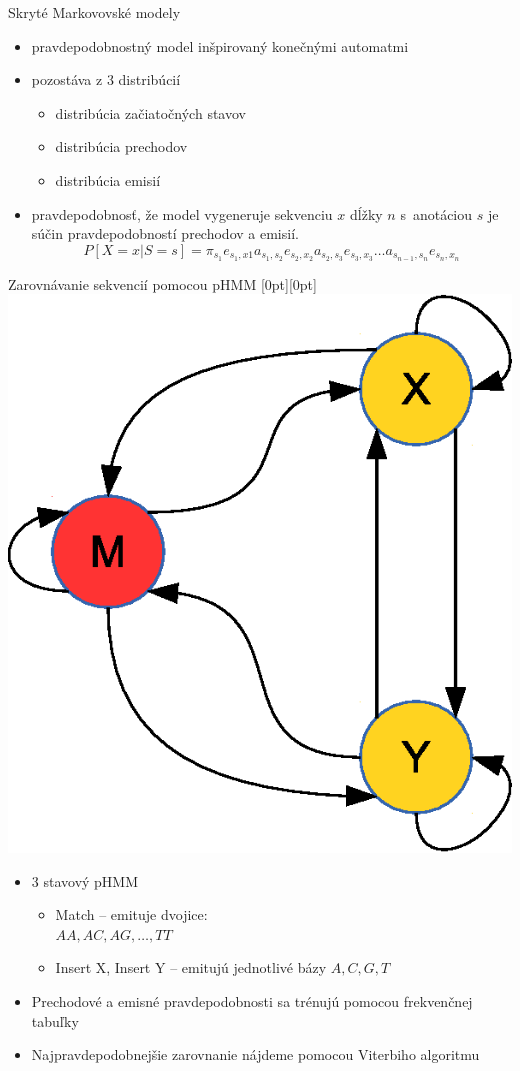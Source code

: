 \documentclass[xcolor=dvipsnames, compress, 12pt]{beamer}
\newcommand{\lenitem}[2][.6\linewidth]{\parbox[t]{#1}{\strut #2\strut}}
\theoremstyle{definition}
\begin{document}
\begin{frame}{Skryté Markovovské modely}
  \begin{itemize}
    \item pravdepodobnostný model inšpirovaný konečnými automatmi
    \item pozostáva z 3 distribúcií
    \begin{itemize}
      \item distribúcia začiatočných stavov
      \item distribúcia prechodov
      \item distribúcia emisií
    \end{itemize}
    \pause
    \item pravdepodobnosť, že model vygeneruje sekvenciu $x$ dĺžky $n$ s~anotáciou $s$ je súčin pravdepodobností prechodov a emisií.
    $$P[X=x | S=s] = \pi_{s_1} e_{s_1,x1} a_{s_1,s_2} e_{s_2,x_2} a_{s_2,s_3} e_{s_3,x_3}\dots a_{s_{n-1},s_n} e_{s_n,x_n}$$
    \cite{skripta, durbin}

  \end{itemize}
\end{frame}

\begin{frame}{Zarovnávanie sekvencií pomocou pHMM}
  \mbox{}\hfill\raisebox{-\height}[0pt][0pt]{
   \includegraphics[width=.30\textwidth]{images/simple_model}
   }
  \vspace*{-\baselineskip}

  \begin{itemize}
    \item \lenitem{3 stavový pHMM}
    \begin{itemize}
      \item \lenitem{Match -- emituje dvojice:\\ $AA, AC, AG,\dots, TT$}
      \item \lenitem{Insert X, Insert Y -- emitujú jednotlivé bázy $A,C,G,T$}
    \end{itemize}
    \item \lenitem{Prechodové a emisné pravdepodobnosti sa trénujú pomocou frekvenčnej tabuľky}
    \item Najpravdepodobnejšie zarovnanie nájdeme pomocou Viterbiho algoritmu
  \end{itemize}
\end{frame}
\end{document}
